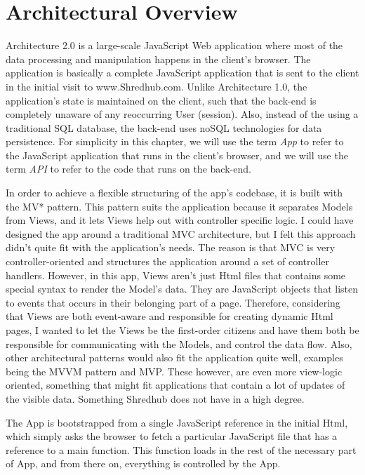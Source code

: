 \section{Architectural Overview}
Architecture 2.0 is a large-scale JavaScript Web application where most of the data processing and manipulation happens in the client's browser. The application is basically a complete JavaScript application that is sent to the client in the initial visit  to www.Shredhub.com. Unlike Architecture 1.0, the application's state is maintained on the client, such that the back-end is completely unaware of any reoccurring User (session). Also, instead of the using a traditional SQL database, the back-end uses noSQL technologies for data persistence. For simplicity in this chapter, we will use the term \textit{App} to refer to the JavaScript application that runs in the client's browser, and we will use the term \textit{API} to refer to the code that runs on the back-end.

In order to achieve a flexible structuring of the app's codebase, it is built with the MV* pattern. This pattern suits the application because it separates Models from Views, and it lets Views help out with controller specific logic. I could have designed the app around a traditional MVC architecture, but I felt this approach didn't quite fit with the application's needs. The reason is that MVC is very controller-oriented and structures the application around a set of controller handlers. However, in this app, Views aren't just Html files that contains some special syntax to render the Model's data. They are JavaScript objects that listen to events that occurs in their belonging part of a page. Therefore, considering that Views are both event-aware and responsible for creating dynamic Html pages, I wanted to let the Views be the first-order citizens and have them both be responsible for communicating with the Models, and control the data flow. Also, other architectural patterns would also fit the application quite well, examples being the MVVM pattern and MVP. These however, are even more view-logic oriented, something that might fit applications that contain a lot of updates of the visible data. Something Shredhub does not have in a high degree.  

The App is bootstrapped from a single JavaScript reference in the initial Html, which simply asks the browser to fetch a particular JavaScript file that has a reference to a main function. This function loads in the rest of the necessary part of App, and from there on, everything is controlled by the App.

